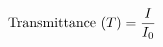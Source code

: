 \documentclass[preview]{standalone}
\begin{document}
\begin{align*}
\special{dvisvgm:raw <g id='unique000'>}\text{Transmittance } (T) = \frac{I}{I_0}\special{dvisvgm:raw </g>}
\end{align*}
\end{document}
